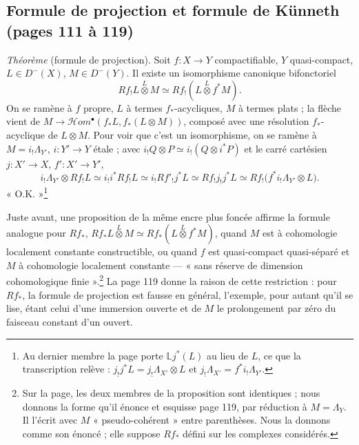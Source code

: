 \documentclass[11pt,a4paper]{article}
\begin{document}
\subsection*{Formule de projection et formule de Künneth (pages 111 à 119)}

\emph{Théorème} (formule de projection). Soit $f : X \to Y$ compactifiable, $Y$
quasi-compact, $L \in D^{-}(X)$, $M \in D^{-}(Y)$. Il existe un isomorphisme
canonique bifonctoriel
\[
  Rf_{!}L \overset{L}{\otimes} M \simeq Rf_{!}(L \overset{L}{\otimes} f^{*}M).
\]
On se ramène à $f$ propre, $L$ à termes $f_{*}$-acycliques, $M$ à termes plats ;
la flèche vient de $M \to \mathcal{H}om^{\bullet}(f_{*}L, f_{*}(L \otimes M))$,
composé avec une résolution $f_{*}$-acyclique de $L \otimes M$. Pour voir que
c'est un isomorphisme, on se ramène à $M = i_{!}\Lambda_{Y'}$, $i : Y' \to Y$
étale ; avec $i_{!}Q \otimes P \simeq i_{!}(Q \otimes i^{*}P)$ et le carré
cartésien $j : X' \to X$, $f' : X' \to Y'$,
\[
  i_{!}\Lambda_{Y'} \otimes Rf_{!}L \simeq i_{!}i^{*}Rf_{!}L \simeq
  i_{!}Rf'_{!}j^{*}L \simeq Rf_{!}j_{!}j^{*}L \simeq Rf_{!}\bigl(f^{*}i_{!}
  \Lambda_{Y'} \otimes L\bigr).
\]
« O.K. »\footnote{Au dernier membre la page porte $\mathbb{L}j^{*}(L)$ au lieu
de $L$, ce que la transcription relève : $j_{!}j^{*}L = j_{!}\Lambda_{X'}
\otimes L$ et $j_{!}\Lambda_{X'} = f^{*}i_{!}\Lambda_{Y'}$.}

Juste avant, une proposition de la même encre plus foncée affirme la formule
analogue pour $Rf_{*}$, $Rf_{*}L \overset{L}{\otimes} M \simeq Rf_{*}(L
\overset{L}{\otimes} f^{*}M)$, quand $M$ est à cohomologie localement constante
constructible, ou quand $f$ est quasi-compact quasi-séparé et $M$ à cohomologie
localement constante --- « sans réserve de dimension cohomologique
finie ».\footnote{Sur la page, les deux membres de la proposition sont
identiques ; nous donnons la forme qu'il énonce et esquisse page 119, par
réduction à $M = \Lambda_{Y}$. Il l'écrit avec $M$ « pseudo-cohérent » entre
parenthèses. Nous la donnons comme son énoncé ; elle suppose $Rf_{*}$ défini sur
les complexes considérés.} La page 119 donne la raison de cette restriction :
pour $Rf_{*}$, la formule de projection est fausse en général, l'exemple, pour autant qu'il se lise, étant
celui d'une immersion ouverte et de $M$ le prolongement par zéro du faisceau
constant d'un ouvert.
\end{document}
